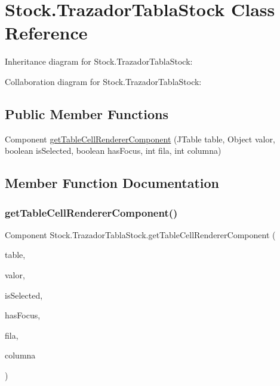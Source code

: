 \hypertarget{class_stock_1_1_trazador_tabla_stock}{}\section{Stock.\+Trazador\+Tabla\+Stock Class Reference}
\label{class_stock_1_1_trazador_tabla_stock}


Inheritance diagram for Stock.\+Trazador\+Tabla\+Stock\+:


Collaboration diagram for Stock.\+Trazador\+Tabla\+Stock\+:
\subsection*{Public Member Functions}
\begin{DoxyCompactItemize}
\item 
Component \mbox{\hyperlink{class_stock_1_1_trazador_tabla_stock_af81dec01f5dd5a106ba9e04cbd15ded5}{get\+Table\+Cell\+Renderer\+Component}} (J\+Table table, Object valor, boolean is\+Selected, boolean has\+Focus, int fila, int columna)
\end{DoxyCompactItemize}


\subsection{Member Function Documentation}
\mbox{\label{class_stock_1_1_trazador_tabla_stock_af81dec01f5dd5a106ba9e04cbd15ded5}} 
\subsubsection{\texorpdfstring{get\+Table\+Cell\+Renderer\+Component()}{getTableCellRendererComponent()}}
{\footnotesize\ttfamily Component Stock.\+Trazador\+Tabla\+Stock.\+get\+Table\+Cell\+Renderer\+Component (\begin{DoxyParamCaption}\item[{J\+Table}]{table,  }\item[{Object}]{valor,  }\item[{boolean}]{is\+Selected,  }\item[{boolean}]{has\+Focus,  }\item[{int}]{fila,  }\item[{int}]{columna }\end{DoxyParamCaption})\hspace{0.3cm}{\ttfamily [inline]}}

